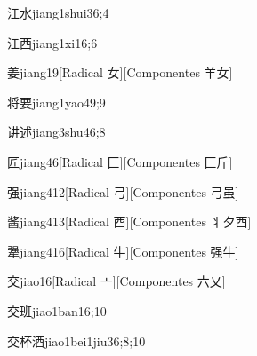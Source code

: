 \begin{verbete}{江水}{jiang1shui3}{6;4}
\end{verbete}

\begin{verbete}{江西}{jiang1xi1}{6;6}
\end{verbete}

\begin{verbete}{姜}{jiang1}{9}[Radical 女][Componentes 羊女]
\end{verbete}

\begin{verbete}{将要}{jiang1yao4}{9;9}
\end{verbete}

\begin{verbete}{讲述}{jiang3shu4}{6;8}
\end{verbete}

\begin{verbete}{匠}{jiang4}{6}[Radical 匚][Componentes 匚斤]
\end{verbete}

\begin{verbete}{强}{jiang4}{12}[Radical 弓][Componentes 弓虽]
\end{verbete}

\begin{verbete}{酱}{jiang4}{13}[Radical 酉][Componentes 丬夕酉]
\end{verbete}

\begin{verbete}{犟}{jiang4}{16}[Radical 牛][Componentes 强牛]
\end{verbete}

\begin{verbete}{交}{jiao1}{6}[Radical 亠][Componentes 六乂]
\end{verbete}

\begin{verbete}{交班}{jiao1ban1}{6;10}
\end{verbete}

\begin{verbete}{交杯酒}{jiao1bei1jiu3}{6;8;10}
\end{verbete}

